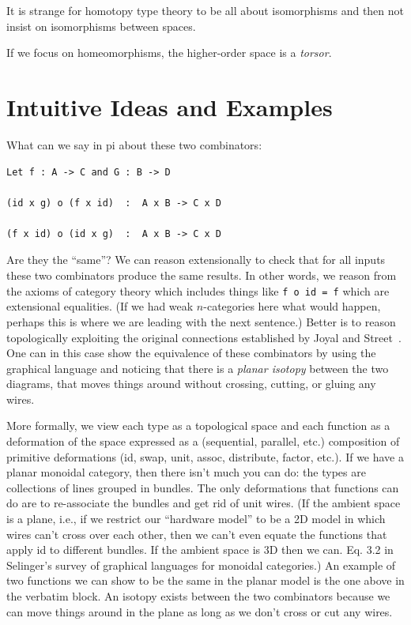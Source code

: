 \documentclass[11pt]{article}
\begin{document}
It is strange for homotopy type theory to be all about isomorphisms and then
not insist on isomorphisms between spaces.

If we focus on homeomorphisms, the higher-order space is a \emph{torsor}.

\section{Intuitive Ideas and Examples} 
\label{sec:intuition}


What can we say in pi about these two combinators:
\begin{verbatim}
Let f : A -> C and G : B -> D

(id x g) o (f x id)  :  A x B -> C x D

(f x id) o (id x g)  :  A x B -> C x D
\end{verbatim}
Are they the ``same''? We can reason extensionally to check that for all
inputs these two combinators produce the same results. In other words, we
reason from the axioms of category theory which includes things like
\verb|f o id = f| which are extensional equalities. (If we had weak
$n$-categories here what would happen, perhaps this is where we are leading
with the next sentence.) Better is to reason topologically exploiting the
original connections established by Joyal and
Street~\cite{planardiagrams,geometrytensor}. One can in this case show the
equivalence of these combinators by using the graphical language and noticing
that there is a \emph{planar isotopy} between the two diagrams, that moves
things around without crossing, cutting, or gluing any wires. 

More formally, we view each type as a topological space and each function as
a deformation of the space expressed as a (sequential, parallel, etc.)
composition of primitive deformations (id, swap, unit, assoc, distribute,
factor, etc.). If we have a planar monoidal category, then there isn't much
you can do: the types are collections of lines grouped in bundles. The only
deformations that functions can do are to re-associate the bundles and get
rid of unit wires. (If the ambient space is a plane, i.e., if we restrict our
``hardware model'' to be a 2D model in which wires can't cross over each
other, then we can't even equate the functions that apply id to different
bundles. If the ambient space is 3D then we can. Eq. 3.2 in Selinger's survey
of graphical languages for monoidal categories.) An example of two functions
we can show to be the same in the planar model is the one above in the
verbatim block. An isotopy exists between the two combinators because we can
move things around in the plane as long as we don't cross or cut any wires.
\end{document}
